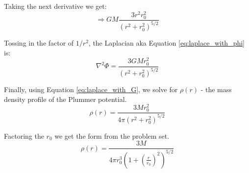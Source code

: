 
Taking the next derivative we get:
\begin{equation}
\Rightarrow GM\frac{3 r^2 r_0^2}{(r^2 + r_0^2)^{5/2}}
\end{equation}

Tossing in the factor of $1/r^2$, the Laplacian aka Equation \ref{eq:laplace_with_phi} is:
\begin{equation}
\nabla^2 \Phi = \frac{3 GM r_0^2}{(r^2 + r_0^2)^{5/2}}
\end{equation}


Finally, using Equation \ref{eq:laplace_with_G}, we solve for $\rho(r)$ -  the mass density profile of the Plummer potential.
\begin{equation}
\boxed{
\rho(r) = \frac{3 M r_0^2}{4 \pi (r^2 + r_0^2)^{5/2}}
}
\end{equation}

Factoring the $r_0$ we get the form from the problem set.
\begin{equation}
\boxed{
\rho(r) = \frac{3 M}{4 \pi r_0^3 \left( 1 + \left(\frac{r}{r_0}\right)^2 \right)^{5/2}}
}
\end{equation}
